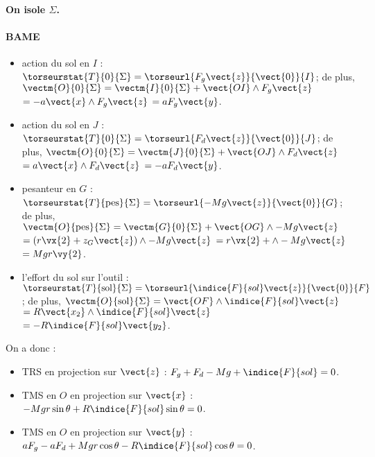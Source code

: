 \ifprof
\begin{corrige}
\paragraph*{On isole $\Sigma$.}

\paragraph*{BAME}
\begin{itemize}
\item action du sol en $I$ : $\torseurstat{T}{0}{\Sigma} = \torseurl{F_g \vect{z}}{\vect{0}}{I}$; de plus, 
$\vectm{O}{0}{\Sigma} = \vectm{I}{0}{\Sigma} + \vect{OI}\wedge F_g \vect{z}$ $=-a\vect{x}\wedge F_g \vect{z}$ $=aF_g \vect{y}$.
\item action du sol en $J$ : $\torseurstat{T}{0}{\Sigma} = \torseurl{F_d \vect{z}}{\vect{0}}{J}$;
de plus, $\vectm{O}{0}{\Sigma} = \vectm{J}{0}{\Sigma} + \vect{OJ}\wedge F_d \vect{z}$ $=a\vect{x}\wedge F_d \vect{z}$ $=-aF_d \vect{y}$.

\item pesanteur en $G$ : $\torseurstat{T}{\text{pes}}{\Sigma} = \torseurl{-Mg \vect{z}}{\vect{0}}{G}$;
de plus, $\vectm{O}{\text{pes}}{\Sigma} = \vectm{G}{0}{\Sigma} + \vect{OG}\wedge -Mg \vect{z}$ $=\left(r \vx{2} +  z_G \vect{z}\right) \wedge -Mg  \vect{z}$ $=r \vx{2} +   \wedge -Mg  \vect{z}$
$=Mg  r \vy{2} $.

\item l'effort du sol sur l'outil : $\torseurstat{T}{\text{sol}}{\Sigma} = \torseurl{\indice{F}{sol} \vect{z}}{\vect{0}}{F}$;
de plus, $\vectm{O}{\text{sol}}{\Sigma} =  \vect{OF}\wedge \indice{F}{sol} \vect{z}$ $=R\vect{x_2}\wedge \indice{F}{sol} \vect{z} $ $=-R\indice{F}{sol} \vect{y_2}$.
\end{itemize}

On a donc : 
\begin{itemize}
\item TRS en projection sur $\vect{z}$ : $F_g+F_d-Mg + \indice{F}{sol} = 0$.
\item TMS en $O$ en projection sur $\vect{x}$ : $ -Mgr \sin \theta +R\indice{F}{sol} \sin \theta= 0$.
\item TMS en $O$ en projection sur $\vect{y}$ : $  aF_g - aF_d+Mgr \cos \theta-R\indice{F}{sol} \cos \theta= 0$.
\end{itemize}


\end{corrige}
